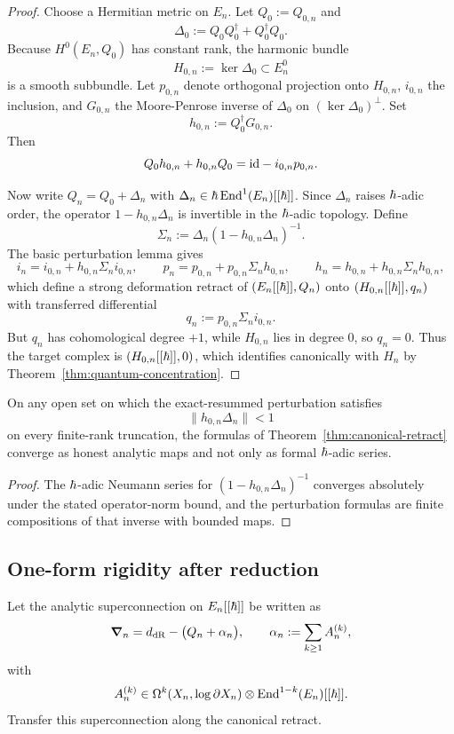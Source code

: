 \begin{proof}
Choose a Hermitian metric on $E_n$. Let $Q_0:=Q_{0,n}$ and
\[
 \Delta_0 := Q_0Q_0^{\dagger}+Q_0^{\dagger}Q_0.
\]
Because $H^0(E_n,Q_0)$ has constant rank, the harmonic bundle
\[
 H_{0,n}:=\ker\Delta_0\subset E_n^0
\]
is a smooth subbundle. Let $p_{0,n}$ denote orthogonal projection onto $H_{0,n}$, $i_{0,n}$ the inclusion, and $G_{0,n}$ the Moore-Penrose inverse of $\Delta_0$ on $(\ker\Delta_0)^\perp$. Set
\[
 h_{0,n}:=Q_0^{\dagger}G_{0,n}.
\]
Then
\[
 Q_0h_{0,n}+h_{0,n}Q_0 = \mathrm{id} - i_{0,n}p_{0,n}.
\]

Now write $Q_n=Q_0+\Delta_n$ with $\Delta_n\in \hbar\,\mathrm{End}^1(E_n)[[\hbar]]$. Since $\Delta_n$ raises $\hbar$-adic order, the operator $1-h_{0,n}\Delta_n$ is invertible in the $\hbar$-adic topology. Define
\[
 \Sigma_n := \Delta_n(1-h_{0,n}\Delta_n)^{-1}.
\]
The basic perturbation lemma gives
\[
 i_n=i_{0,n}+h_{0,n}\Sigma_n i_{0,n},
 \qquad
 p_n=p_{0,n}+p_{0,n}\Sigma_n h_{0,n},
 \qquad
 h_n=h_{0,n}+h_{0,n}\Sigma_n h_{0,n},
\]
which define a strong deformation retract of $(E_n[[\hbar]],Q_n)$ onto $(H_{0,n}[[\hbar]],q_n)$ with transferred differential
\[
 q_n:=p_{0,n}\Sigma_n i_{0,n}.
\]
But $q_n$ has cohomological degree $+1$, while $H_{0,n}$ lies in degree $0$, so $q_n=0$. Thus the target complex is $(H_{0,n}[[\hbar]],0)$, which identifies canonically with $H_n$ by Theorem~\ref{thm:quantum-concentration}.
\end{proof}

\begin{proposition}%
On any open set on which the exact-resummed perturbation satisfies
\[
 \|h_{0,n}\Delta_n\|<1
\]
on every finite-rank truncation, the formulas of Theorem~\ref{thm:canonical-retract} converge as honest analytic maps and not only as formal $\hbar$-adic series.
\end{proposition}

\begin{proof}
The $\hbar$-adic Neumann series for $(1-h_{0,n}\Delta_n)^{-1}$ converges absolutely under the stated operator-norm bound, and the perturbation formulas are finite compositions of that inverse with bounded maps.
\end{proof}

\subsection{One-form rigidity after reduction}
Let the analytic superconnection on $E_n[[\hbar]]$ be written as
\[
 \boldsymbol{\nabla}_n = d_{\mathrm{dR}}-\big(Q_n+\alpha_n\big),
 \qquad
 \alpha_n:=\sum_{k\ge 1}A_n^{(k)},
\]
with
\[
 A_n^{(k)}\in \Omega^k(X_n,\log\partial X_n)\otimes \mathrm{End}^{1-k}(E_n)[[\hbar]].
\]
Transfer this superconnection along the canonical retract.

